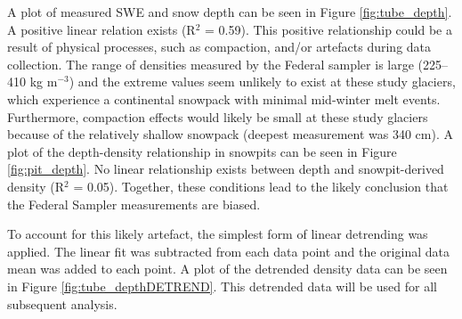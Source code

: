 \documentclass[12pt]{article}
\begin{document}
A plot of measured SWE and snow depth can be seen in Figure \ref{fig:tube_depth}. A positive linear relation exists (R$^2$ = 0.59). This positive relationship could be a result of physical processes, such as compaction, and/or artefacts during data collection. The range of densities measured by the Federal sampler is large (225--410 kg m$^{-3}$) and the extreme values seem unlikely to exist at these study glaciers, which experience a continental snowpack with minimal mid-winter melt events. Furthermore, compaction effects would likely be small at these study glaciers because of the relatively shallow snowpack (deepest measurement was 340 cm). A plot of the depth-density relationship in snowpits can be seen in Figure \ref{fig:pit_depth}. No linear relationship exists between depth and snowpit-derived density (R$^2$ = 0.05). Together, these conditions lead to the likely conclusion that the Federal Sampler measurements are biased. 

To account for this likely artefact, the simplest form of linear detrending was applied. The linear fit was subtracted from each data point and the original data mean was added to each point. A plot of the detrended density data can be seen in Figure \ref{fig:tube_depthDETREND}. This detrended data will be used for all subsequent analysis. 
\end{document}

